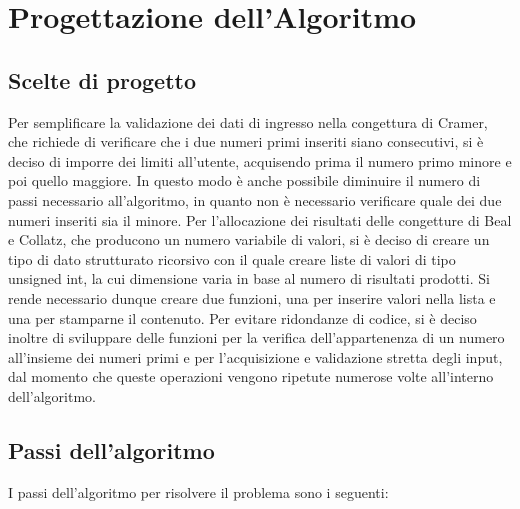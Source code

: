 \documentclass[10pt]{report}
\begin{document}
\newpage


\section{Progettazione dell'Algoritmo}

\subsection{Scelte di progetto}
Per semplificare la validazione dei dati di ingresso nella congettura di Cramer, che richiede di verificare che i due numeri primi inseriti siano consecutivi, 
si è deciso di imporre dei limiti all'utente, acquisendo prima il numero primo minore e poi quello maggiore. In questo modo è anche possibile diminuire il numero di passi
necessario all'algoritmo, in quanto non è necessario verificare quale dei due numeri inseriti sia il minore.
\newline
\newline
Per l'allocazione dei risultati delle congetture di Beal e Collatz, che producono un numero variabile di valori, si è deciso di creare un tipo di dato strutturato 
ricorsivo con il quale creare liste di valori di tipo unsigned int, la cui dimensione varia in base al numero di risultati prodotti. Si rende necessario dunque creare due 
funzioni, una per inserire valori nella lista e una per stamparne il contenuto.
\newline
\newline
Per evitare ridondanze di codice, si è deciso inoltre di sviluppare delle funzioni per la verifica dell'appartenenza di un numero all'insieme dei numeri primi e per l'acquisizione e validazione stretta degli input, dal momento che queste operazioni vengono ripetute numerose volte all'interno dell'algoritmo.


\subsection{Passi dell'algoritmo}
I passi dell'algoritmo per risolvere il problema sono i seguenti:
\end{document}
